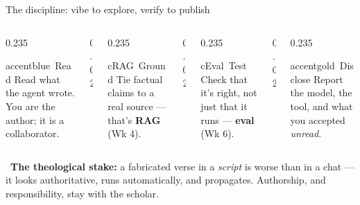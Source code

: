 \begin{frame}{The discipline: vibe to explore, verify to publish}
  \begin{columns}[t, totalwidth=\textwidth]
    \begin{column}{0.235\textwidth}
      \begin{featbox}{accentblue}{\faBookOpen\ Read}
        \scriptsize Read what the agent wrote. You are the author; it is a collaborator.
      \end{featbox}
    \end{column}
    \begin{column}{0.02\textwidth}\end{column}
    \begin{column}{0.235\textwidth}
      \begin{featbox}{cRAG}{\faLayerGroup\ Ground}
        \scriptsize Tie factual claims to a real source --- that's \textbf{RAG} (Wk 4).
      \end{featbox}
    \end{column}
    \begin{column}{0.02\textwidth}\end{column}
    \begin{column}{0.235\textwidth}
      \begin{featbox}{cEval}{\faClipboardCheck\ Test}
        \scriptsize Check that it's right, not just that it runs --- \textbf{eval} (Wk 6).
      \end{featbox}
    \end{column}
    \begin{column}{0.02\textwidth}\end{column}
    \begin{column}{0.235\textwidth}
      \begin{featbox}{accentgold}{\faFileSignature\ Disclose}
        \scriptsize Report the model, the tool, and what you accepted \emph{unread}.
      \end{featbox}
    \end{column}
  \end{columns}
  \vspace{10pt}
  \begin{calloutbox}[cRAG]
    \small\faBalanceScale\ \textbf{The theological stake:} a fabricated verse in a
    \emph{script} is worse than in a chat --- it looks authoritative, runs
    automatically, and propagates. Authorship, and responsibility, stay with the scholar.
  \end{calloutbox}
\end{frame}


